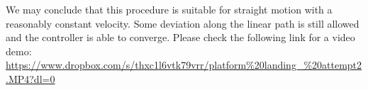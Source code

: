 \noindent
We may conclude that this procedure is suitable for straight motion with a reasonably constant velocity. Some deviation along the linear path is still allowed and the controller is able to converge. Please check the following link for a video demo: \url{https://www.dropbox.com/s/thxc1l6vtk79vrr/platform%20landing_%20attempt2.MP4?dl=0}